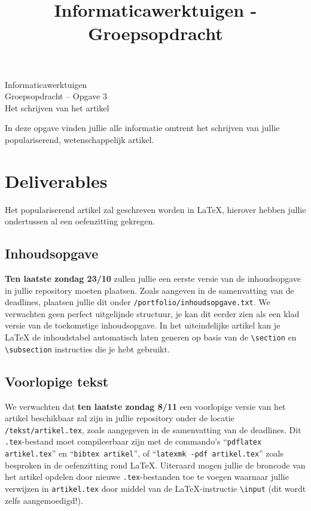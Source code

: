 \documentclass[a4paper]{article}
\title{Informaticawerktuigen - Groepsopdracht}
\begin{document}
\begin{center}
  \huge Informaticawerktuigen \\
  \Huge Groepsopdracht -- Opgave 3 \\
  \huge Het schrijven van het artikel
\end{center}
\vspace{1em}

In deze opgave vinden jullie alle informatie omtrent het schrijven van jullie populariserend, wetenschappelijk artikel.


\section{Deliverables}

Het populariserend artikel zal geschreven worden in \LaTeX{}, hierover hebben jullie ondertussen al een oefenzitting gekregen.

\subsection{Inhoudsopgave}

\textbf{Ten laatste zondag 23/10} zullen jullie een eerste versie van de inhoudsopgave in jullie repository moeten plaatsen.
Zoals aangeven in de samenvatting van de deadlines, plaatsen jullie dit onder \texttt{/portfolio/inhoudsopgave.txt}.
We verwachten geen perfect uitgelijnde structuur, je kan dit eerder zien als een klad versie van de toekomstige inhoudsopgave.
In het uiteindelijke artikel kan je \LaTeX{} de inhoudstabel automatisch laten generen op basis van de \texttt{\textbackslash section} en \texttt{\textbackslash subsection} instructies die je hebt gebruikt.


\subsection{Voorlopige tekst}

We verwachten dat \textbf{ten laatste zondag 8/11} een voorlopige versie van het artikel beschikbaar zal zijn in jullie repository onder de locatie \texttt{/tekst/artikel.tex}, zoals aangegeven in de samenvatting van de deadlines.
Dit \texttt{.tex}-bestand moet compileerbaar zijn met de commando's ``\texttt{pdflatex artikel.tex}'' en ``\texttt{bibtex artikel}'', of ``\texttt{latexmk -pdf artikel.tex}'' zoals besproken in de oefenzitting rond \LaTeX{}.
Uiteraard mogen jullie de broncode van het artikel opdelen door nieuwe \texttt{.tex}-bestanden toe te voegen waarnaar jullie verwijzen in \texttt{artikel.tex} door middel van de \LaTeX{}-instructie \texttt{\textbackslash input} (dit wordt zelfs aangemoedigd!).
\end{document}

